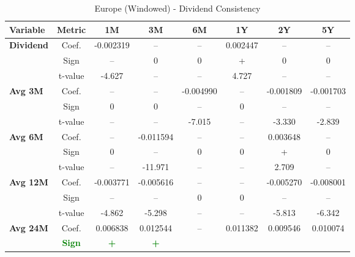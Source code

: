\documentclass[11pt,english,a4paper,hidelinks]{book}
\begin{document}
\begin{table}[H]
    \centering
    \caption{Europe (Windowed) - Dividend Consistency}
    \begin{tabular}{lccccccc}
        \toprule
        \textbf{Variable} & \textbf{Metric} & \textbf{1M} & \textbf{3M} & \textbf{6M} & \textbf{1Y} & \textbf{2Y} & \textbf{5Y} \\
        \midrule
        \multirow{3}{*}{\textbf{Dividend}}
            & Coef.   & -0.002319 & --        & --        & 0.002447  & --        & --        \\
            & Sign    & –         & 0         & 0         & +         & 0         & 0         \\
            & t-value & -4.627    & --        & --        & 4.727     & --        & --        \\
        \cmidrule{1-8}
        \multirow{3}{*}{\textbf{Avg 3M}}
            & Coef.   & --        & --        & -0.004990 & --        & -0.001809 & -0.001703 \\
            & Sign    & 0         & 0         & –         & 0         & –         & –         \\
            & t-value & --        & --        & -7.015    & --        & -3.330    & -2.839    \\
        \cmidrule{1-8}
        \multirow{3}{*}{\textbf{Avg 6M}}
            & Coef.   & --        & -0.011594 & --        & --        & 0.003648  & --        \\
            & Sign    & 0         & –         & 0         & 0         & +         & 0         \\
            & t-value & --        & -11.971   & --        & --        & 2.709     & --        \\
        \cmidrule{1-8}
        \multirow{3}{*}{\textbf{Avg 12M}}
            & Coef.   & -0.003771 & -0.005616 & --        & --        & -0.005270 & -0.008001 \\
            & Sign    & –         & –         & 0         & 0         & –         & –         \\
            & t-value & -4.862    & -5.298    & --        & --        & -5.813    & -6.342    \\
        \cmidrule{1-8}
        \multirow{3}{*}{\textbf{Avg 24M}}
            & Coef.   & 0.006838  & 0.012544  & --        & 0.011382  & 0.009546  & 0.010074  \\
            & \textbf{\textcolor{green}{Sign}}
                     & \textbf{\textcolor{green}{+}}
                     & \textbf{\textcolor{green}{+}}

\end{tabular}
\end{table}
\end{document}

